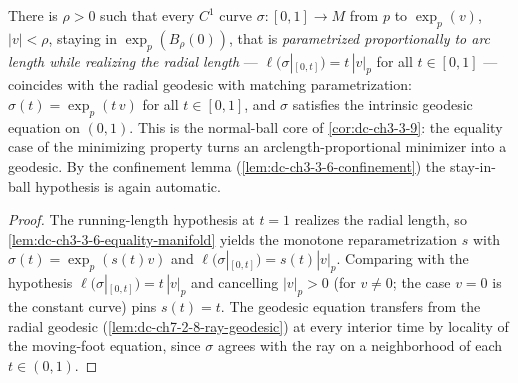 \begin{lemma}
  \label{lem:dc-ch3-3-6-equality-geodesic}
  \leanok
  There is $\rho>0$ such that every $C^1$ curve $\sigma:[0,1]\to M$ from $p$
  to $\exp_p(v)$, $|v|<\rho$, staying in $\exp_p(B_\rho(0))$, that is
  \emph{parametrized proportionally to arc length while realizing the radial
  length} — $\ell(\sigma|_{[0,t]})=t\,|v|_p$ for all $t\in[0,1]$ — coincides
  with the radial geodesic with matching parametrization:
  $\sigma(t)=\exp_p(t\,v)$ for all $t\in[0,1]$, and $\sigma$ satisfies the
  intrinsic geodesic equation on $(0,1)$. This is the normal-ball core of
  \cref{cor:dc-ch3-3-9}: the equality case of the minimizing property turns
  an arclength-proportional minimizer into a geodesic. By the confinement
  lemma (\cref{lem:dc-ch3-3-6-confinement}) the stay-in-ball hypothesis is
  again automatic.
\end{lemma}
\begin{proof}
  \sketch
  \leanok
  The running-length hypothesis at $t=1$ realizes the radial length, so
  \cref{lem:dc-ch3-3-6-equality-manifold} yields the monotone
  reparametrization $s$ with $\sigma(t)=\exp_p(s(t)v)$ and
  $\ell(\sigma|_{[0,t]})=s(t)|v|_p$. Comparing with the hypothesis
  $\ell(\sigma|_{[0,t]})=t\,|v|_p$ and cancelling $|v|_p>0$ (for $v\ne0$;
  the case $v=0$ is the constant curve) pins $s(t)=t$. The geodesic equation
  transfers from the radial geodesic (\cref{lem:dc-ch7-2-8-ray-geodesic}) at
  every interior time by locality of the moving-foot equation, since
  $\sigma$ agrees with the ray on a neighborhood of each $t\in(0,1)$.

\end{proof}


